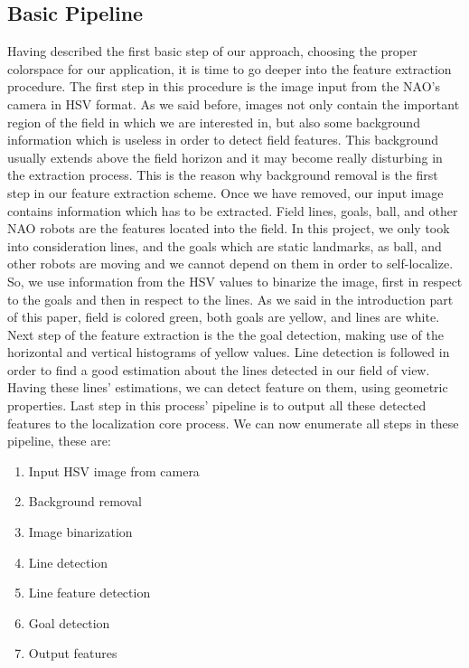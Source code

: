 \documentclass[	DIV=calc,%
							paper=a4,%
							fontsize=11pt,%
							twocolumn]{scrartcl}	 					%
\begin{document}
\subsection{Basic Pipeline}
Having described the first basic step of our approach, choosing the proper colorspace for our application, it is time to go deeper into the feature extraction procedure.
The first step in this procedure is the image input from the NAO's camera in HSV format. As we said before, images not only contain the important region of the field in which we are interested in, but also some background information which is useless in order to detect field features. This background usually extends above the field horizon and it may become really disturbing in the extraction process. This is the reason why background removal is the first step in our feature extraction scheme. Once we have removed, our input image contains information which has to be extracted. Field lines, goals, ball, and other NAO robots are the features located into the field. In this project, we only took into consideration lines, and the goals which are static landmarks, as ball, and other robots are moving and we cannot depend on them in order to self-localize. So, we use information from the HSV values to binarize the image, first in respect to the goals and then in respect to the lines. As we said in the introduction part of this paper, field is colored green, both goals are yellow, and lines are white. Next step of the feature extraction is the the goal detection, making use of the horizontal and vertical histograms of yellow values. Line detection is followed in order to find a good estimation about the lines detected in our field of view. Having these lines' estimations, we can detect feature on them, using geometric properties. Last step in this process' pipeline is to output all these detected features to the localization core process. We can now enumerate all steps in these pipeline, these are:
\begin{enumerate}
\item Input HSV image from camera
\item Background removal
\item Image binarization
\item Line detection
\item Line feature detection
\item Goal detection
\item Output features
\end{enumerate}
\end{document}
